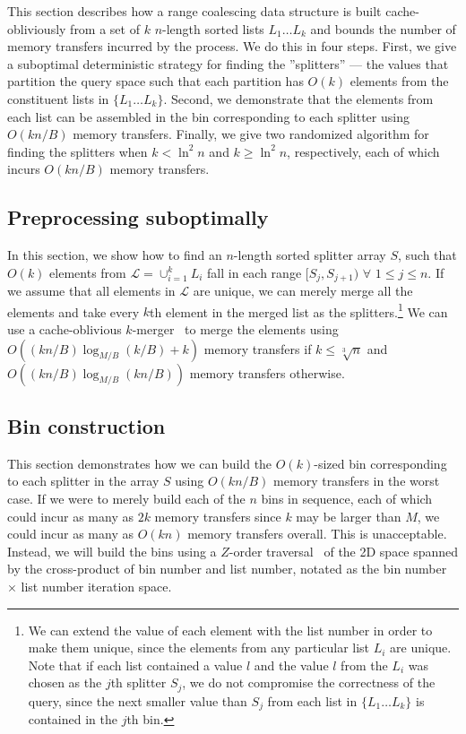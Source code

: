 
This section describes how a range coalescing data structure is built cache-obliviously
from a set of $k$ $n$-length sorted lists $L_1 \ldots L_k$ and bounds
the number of memory transfers incurred by the process.  We do this in four steps.
First, we give a suboptimal deterministic strategy for finding the ''splitters'' 
--- the values that partition the query space such that each partition has $O(k)$ 
elements from the constituent lists in $\{ L_1 \ldots L_k \}$.  Second, we 
demonstrate that the elements from each list can be assembled in the bin corresponding
to each splitter using $O(kn / B)$ memory transfers.  
Finally, we give two randomized algorithm for finding the splitters when 
$k < \ln^2 n$ and $k \geq \ln^2 n$, 
respectively, each of which incurs $O(kn/B)$ memory transfers.  

\subsection*{Preprocessing suboptimally}

In this section, we show how to find an $n$-length sorted splitter array $S$, such that $O(k)$
elements from $\mathcal{L} = \cup_{i=1}^{k}L_i$ fall in each range 
$[S_j,S_{j+1})$ $\forall$ $1 \leq j \leq n$.  If we assume that all elements in $\mathcal{L}$ are 
unique, we can merely merge all the elements and take every $k$th element in the
merged list as the splitters.\footnote{We can extend the value of each element with the
list number in order to make them unique, since the elements from any particular
list $L_i$ are unique.  Note that if each list contained a value $l$ and the
value $l$ from
the $L_i$ was chosen as the $j$th splitter $S_j$, we do not compromise the correctness of the 
query, since the next smaller value than $S_j$ from each list in $\{ L_1 \ldots L_k\}$ is 
contained in the $j$th bin.} We can use a cache-oblivious 
$k$-merger~\cite{FrigoLePr99} to merge the elements using 
$O((kn/B) \log_{M/B} (k/B) + k)$ memory transfers if $k \leq \sqrt[3]{n}$ and
$O((kn/B) \log_{M/B} (kn/B))$ memory transfers otherwise.



\subsection*{Bin construction}

This section demonstrates how we can build the $O(k)$-sized bin corresponding to each splitter
in the array $S$ using $O(kn/B)$ memory transfers in the worst case.
If we were to merely build each of the $n$ bins in sequence, each of which could
incur as many as $2k$ memory transfers since $k$ may be larger than $M$, we could
incur as many as $O(kn)$ memory transfers overall.  This is unacceptable.  
Instead, we will build the bins using a $Z$-order traversal~\cite{Morton66} of 
the 2D space spanned by the cross-product of bin number and list number, notated
as the bin number $\times$ list number iteration space.

